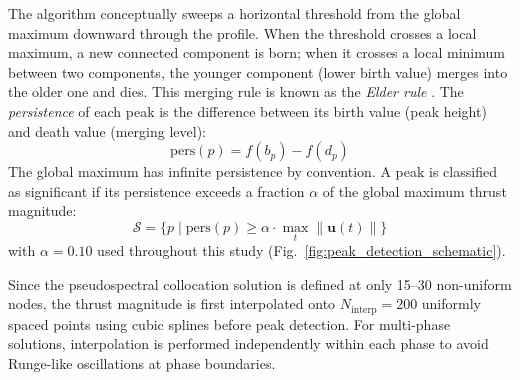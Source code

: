 \documentclass[a4paper,fleqn]{cas-dc}
\begin{document}
The algorithm conceptually sweeps a horizontal threshold from the global maximum downward through the profile. When the threshold crosses a local maximum, a new connected component is born; when it crosses a local minimum between two components, the younger component (lower birth value) merges into the older one and dies. This merging rule is known as the \textit{Elder rule} \citep{Edelsbrunner2010}. The \textit{persistence} of each peak is the difference between its birth value (peak height) and death value (merging level):
\begin{equation}
  \mathrm{pers}(p) = f(b_p) - f(d_p)
  \label{eq:persistence}
\end{equation}
The global maximum has infinite persistence by convention. A peak is classified as significant if its persistence exceeds a fraction $\alpha$ of the global maximum thrust magnitude:
\begin{equation}
  \mathcal{S} = \bigl\{p \mid \mathrm{pers}(p) \geq \alpha \cdot \max_t \|\mathbf{u}(t)\| \bigr\}
  \label{eq:significant_peaks}
\end{equation}
with $\alpha = 0.10$ used throughout this study (Fig.~\ref{fig:peak_detection_schematic}).

Since the pseudospectral collocation solution is defined at only 15--30 non-uniform nodes, the thrust magnitude is first interpolated onto $N_{\mathrm{interp}} = 200$ uniformly spaced points using cubic splines before peak detection. For multi-phase solutions, interpolation is performed independently within each phase to avoid Runge-like oscillations at phase boundaries.
\end{document}
